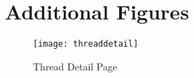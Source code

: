 \chapter{Additional Figures}
\begin{figure}[H]
    \begin{center}
    \texttt{[image: threaddetail]}
    \end{center}
    \caption{Thread Detail Page}
    \label{fig:threaddetail}
\end{figure}